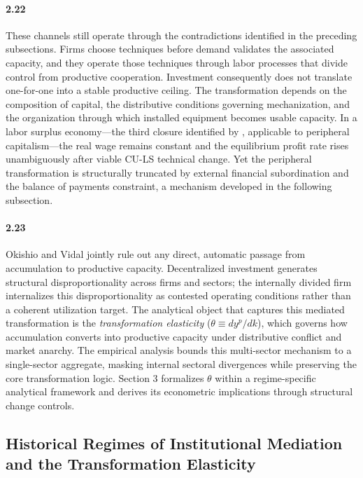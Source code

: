 \paragraph{2.22}
These channels still operate through the contradictions
identified in the preceding subsections. Firms choose techniques
before demand validates the associated capacity, and they
operate those techniques through labor processes that divide
control from productive cooperation. Investment consequently
does not translate one-for-one into a stable productive ceiling.
The transformation depends on the composition of capital, the
distributive conditions governing mechanization, and the
organization through which installed equipment becomes usable
capacity. In a labor surplus economy---the third closure
identified by \citet{Basu2026}, applicable to peripheral
capitalism---the real wage remains constant and the equilibrium
profit rate rises unambiguously after viable CU-LS technical
change. Yet the peripheral transformation is structurally
truncated by external financial subordination and the balance of
payments constraint, a mechanism developed in the following
subsection.

\paragraph{2.23}
Okishio and Vidal jointly rule out any direct, automatic
passage from accumulation to productive capacity.
Decentralized investment generates structural
disproportionality across firms and sectors; the internally
divided firm internalizes this disproportionality as
contested operating conditions rather than a coherent
utilization target. The analytical object that captures this
mediated transformation is the \textit{transformation elasticity} ($\theta \equiv d y^p / d k$), which governs how
accumulation converts into productive capacity under
distributive conflict and market anarchy. The empirical
analysis bounds this multi-sector mechanism to a
single-sector aggregate, masking internal sectoral
divergences while preserving the core transformation logic.
Section 3 formalizes $\theta$ within a regime-specific
analytical framework and derives its econometric
implications through structural change controls.


\subsection{Historical Regimes of Institutional Mediation and the Transformation Elasticity}

